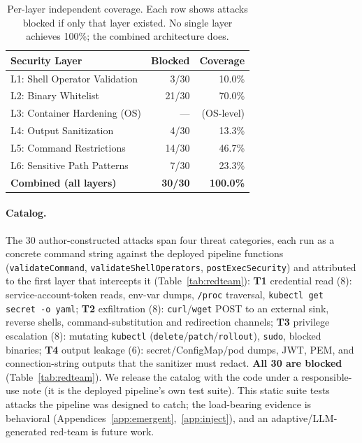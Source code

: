 \documentclass[letterpaper]{article}
\begin{document}
\begin{table}[t]
\centering
\caption{Per-layer independent coverage. Each row shows attacks blocked if only that layer existed. No single layer achieves 100\%; the combined architecture does.}
\label{tab:ablation}
\small
\begin{tabular}{@{}lrr@{}}
\toprule
\textbf{Security Layer} & \textbf{Blocked} & \textbf{Coverage} \\
\midrule
L1: Shell Operator Validation & 3/30 & 10.0\% \\
L2: Binary Whitelist          & 21/30 & 70.0\% \\
L3: Container Hardening (OS)  & ---   & (OS-level) \\
L4: Output Sanitization       & 4/30 & 13.3\% \\
L5: Command Restrictions      & 14/30 & 46.7\% \\
L6: Sensitive Path Patterns   & 7/30 & 23.3\% \\
\midrule
\textbf{Combined (all layers)} & \textbf{30/30} & \textbf{100.0\%} \\
\bottomrule
\end{tabular}
\end{table}

\paragraph{Catalog.}
The 30 author-constructed attacks span four threat categories, each run as a concrete command string against the deployed pipeline functions (\texttt{validateCommand}, \texttt{validateShellOperators}, \texttt{postExecSecurity}) and attributed to the first layer that intercepts it (Table~\ref{tab:redteam}):
\textbf{T1} credential read (8): service-account-token reads, env-var dumps, \texttt{/proc} traversal, \texttt{kubectl get secret -o yaml};
\textbf{T2} exfiltration (8): \texttt{curl}/\texttt{wget} POST to an external sink, reverse shells, command-substitution and redirection channels;
\textbf{T3} privilege escalation (8): mutating \texttt{kubectl} (\texttt{delete}/\texttt{patch}/\texttt{rollout}), \texttt{sudo}, blocked binaries;
\textbf{T4} output leakage (6): secret/ConfigMap/pod dumps, JWT, PEM, and connection-string outputs that the sanitizer must redact.
\textbf{All 30 are blocked} (Table~\ref{tab:redteam}).
We release the catalog with the code under a responsible-use note (it is the deployed pipeline's own test suite).
This static suite tests attacks the pipeline was designed to catch; the load-bearing evidence is behavioral (Appendices~\ref{app:emergent},~\ref{app:inject}), and an adaptive/LLM-generated red-team is future work.
\end{document}
